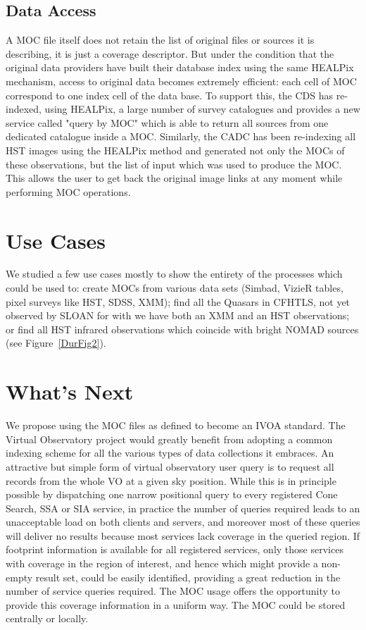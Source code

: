 \subsection{Data Access}
A MOC file itself does not retain the list of original files or sources it is describing, it is just a coverage descriptor. But under the condition that the original data providers have built their database index using the same HEALPix mechanism, access to original data becomes extremely efficient: each cell of MOC correspond to one index cell of the data base. 
To support this, the CDS has re-indexed, using HEALPix, a large number of survey catalogues and provides a new service called "query by MOC" which is able to return all sources from one dedicated catalogue inside a MOC. Similarly, the CADC has been re-indexing all HST images using the HEALPix method and generated not only the MOCs of these observations, but the list of input which was used to produce the MOC. This allows the user to get back the original image links at any moment while performing MOC operations.

\section{Use Cases}
We studied a few use cases mostly to show the entirety of the processes which could be used to: create MOCs from various data sets (Simbad, VizieR tables, pixel surveys like HST, SDSS, XMM); find all the Quasars in CFHTLS, not yet observed by SLOAN for with we have both an XMM and an HST observations; or find all HST infrared observations which coincide with bright NOMAD sources (see Figure~\ref{DurFig2}).


\section{What's Next}

We propose using the MOC files as defined to become an IVOA standard. 
The Virtual Observatory project would greatly benefit from adopting a common indexing scheme for all the various types of data collections it embraces. 
An attractive but simple form of virtual observatory user query is
to request all records from the whole VO at a given sky position.
While this is in principle possible by dispatching one narrow
positional query to every registered Cone Search, SSA or SIA service,
in practice the number of queries required leads to an unacceptable
load on both clients and servers, and moreover most of these queries
will deliver no results because most services lack coverage in the
queried region. If footprint information is available for all registered services, only those
services with coverage in the region of interest, and hence which
might provide a non-empty result set, could be easily identified,
providing a great reduction in the number of service queries required.
The MOC usage offers the opportunity to provide
this coverage information in a uniform way. The MOC could be stored centrally or locally.


